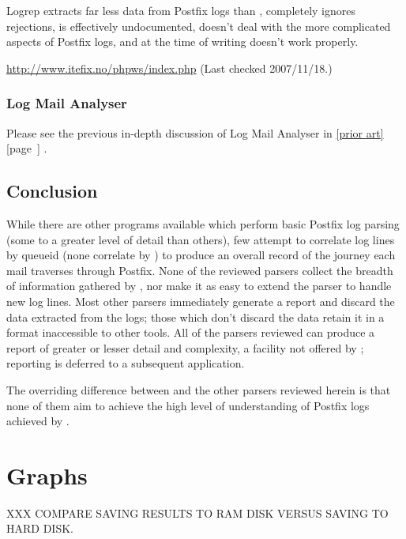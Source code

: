 \documentclass[a4paper,12pt,draft]{article}
\newcommand{\parsername}{\PLP{}}
\newcommand{\refwithpage}[1]{%
    \empty{}\ref{#1} [page~\pageref{#1}]%
}
\newcommand{\sectionref}[1]{%
    \textsection{}\refwithpage{#1}%
}
\begin{document}
Logrep extracts far less data from Postfix logs than \parsername{},
completely ignores rejections, is effectively undocumented, doesn't deal
with the more complicated aspects of Postfix logs, and at the time of
writing doesn't work properly.

\url{http://www.itefix.no/phpws/index.php} \newline (Last checked
2007/11/18.)

\subsubsection{Log Mail Analyser}

Please see the previous in-depth discussion of Log Mail Analyser in
\sectionref{prior art}.


\subsection{Conclusion}

While there are other programs available which perform basic Postfix log
parsing (some to a greater level of detail than others), few attempt to
correlate log lines by queueid (none correlate by \pid{}) to produce an
overall record of the journey each mail traverses through Postfix.  None of
the reviewed parsers collect the breadth of information gathered by
\parsername{}, nor make it as easy to extend the parser to handle new log
lines.  Most other parsers immediately generate a report and discard the
data extracted from the logs; those which don't discard the data retain it
in a format inaccessible to other tools.  All of the parsers reviewed can
produce a report of greater or lesser detail and complexity, a facility not
offered by \parsername{}; reporting is deferred to a subsequent
application.

The overriding difference between \parsername{} and the other parsers
reviewed herein is that none of them aim to achieve the high level of
understanding of Postfix logs achieved by \parsername{}.




\label{bibliography}

\section{Graphs}

\label{graphs}

XXX COMPARE SAVING RESULTS TO RAM DISK VERSUS SAVING TO HARD DISK\@.
\end{document}
